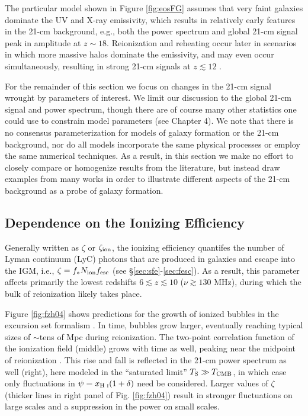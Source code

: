 The particular model shown in Figure \ref{fig:eosFG} \cite{Mesinger2016} assumes that very faint galaxies dominate the UV and X-ray emissivity, which results in relatively early features in the 21-cm background, e.g., both the power spectrum and global 21-cm signal peak in amplitude at $z \sim 18$. Reionization and reheating occur later in scenarios in which more massive halos dominate the emissivity, and may even occur simultaneously, resulting in strong 21-cm signals at $z \lesssim 12$ \cite{Mesinger2016,Mirocha2017,Park2019}. 

For the remainder of this section we focus on changes in the 21-cm signal wrought by parameters of interest. We limit our discussion to the global 21-cm signal and power spectrum, though there are of course many other statistics one could use to constrain model parameters (see Chapter 4). We note that there is no consensus parameterization for models of galaxy formation or the 21-cm background, nor do all models incorporate the same physical processes or employ the same numerical techniques. As a result, in this section we make no effort to closely compare or homogenize results from the literature, but instead draw examples from many works in order to illustrate different aspects of the 21-cm background as a probe of galaxy formation. 

\subsection{Dependence on the Ionizing Efficiency} \label{sec:dep_zeta}
Generally written as $\zeta$ or $\zeta_{\text{ion}}$, the ionizing efficiency quantifes the number of Lyman continuum (LyC) photons that are produced in galaxies and escape into the IGM, i.e., $\zeta=f_{\ast} N_{\text{ion}} f_{\text{esc}}$ (see \S\ref{sec:sfe}-\ref{sec:fesc}). As a result, this parameter affects primarily the lowest redshifts $6 \lesssim z \lesssim 10$ ($\nu \gtrsim 130$ MHz), during which the bulk of reionization likely takes place.

Figure \ref{fig:fzh04} shows predictions for the growth of ionized bubbles in the excursion set formalism \cite{Furlanetto2004}. In time, bubbles grow larger, eventually reaching typical sizes of $\sim $tens of Mpc during reionization. The two-point correlation function of the ionization field (middle) grows with time as well, peaking near the midpoint of reionization \cite{Lidz2008}. This rise and fall is reflected in the 21-cm power spectrum as well (right), here modeled in the ``saturated limit'' $T_{\text{S}} \gg T_{\text{CMB}}$, in which case only fluctuations in $\psi = x_{\text{H } \textsc{i}} (1 + \delta)$ need be considered. Larger values of $\zeta$ (thicker lines in right panel of Fig. \ref{fig:fzh04}) result in stronger fluctuations on large scales and a suppression in the power on small scales.

